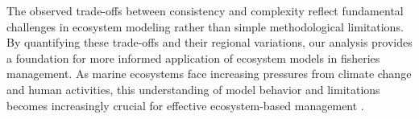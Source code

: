 The observed trade-offs between consistency and complexity reflect fundamental challenges in ecosystem modeling rather than simple methodological limitations. By quantifying these trade-offs and their regional variations, our analysis provides a foundation for more informed application of ecosystem models in fisheries management. As marine ecosystems face increasing pressures from climate change and human activities, this understanding of model behavior and limitations becomes increasingly crucial for effective ecosystem-based management \citep{Geary2020}.
